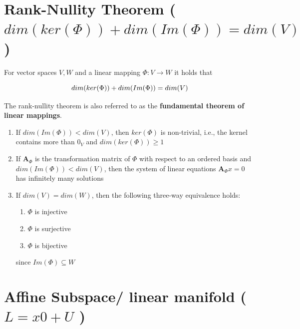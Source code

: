 

\section{Rank-Nullity Theorem ( $dim(ker(\Phi)) + dim(Im(\Phi)) = dim(V)$ ) \cite{mfml-1}}\label{Rank-Nullity Theorem}

For vector spaces $V, W$ and a linear mapping $\Phi : V \to W$ it holds that 

\[
    \hfill
    dim(ker(\Phi)) + dim(Im(\Phi)) = dim(V)
    \hfill
\]

The rank-nullity theorem is also referred to as the \textbf{fundamental theorem of linear mappings}.

\begin{enumerate}
    \item If $dim(Im(\Phi)) < dim(V)$, then $ker(\Phi)$ is non-trivial, i.e., the kernel contains more than $0_V$ and $dim(ker(\Phi)) \geq 1$

    \item If $\mathbf{A}_\Phi$ is the transformation matrix of $\Phi$ with respect to an ordered basis and $dim(Im(\Phi)) < dim(V)$, then the system of linear equations $\mathbf{A}_\Phi x = 0$ has infinitely many solutions

    \item If $dim(V) = dim(W)$, then the following three-way equivalence holds: 
    \begin{enumerate}
        \item $\Phi$ is injective

        \item $\Phi$ is surjective

        \item $\Phi$ is bijective 
    \end{enumerate}
    since $Im(\Phi) \subseteq W$

    
\end{enumerate}






\section{Affine Subspace/ linear manifold ( $L = x0 + U$ ) \cite{mfml-1}}\label{Affine Subspace/ linear manifold}

